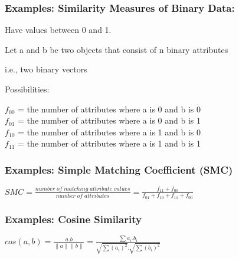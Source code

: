\begin{frame}[fragile]\frametitle{Examples: Similarity Measures of Binary Data:}

	Have values between 0 and 1.
	
	Let a and b be two objects that consist of n binary attributes 
	
	i.e., two binary vectors
	
	Possibilities:

		$f_{00}$ = the number of attributes where a is 0 and b is 0 \\
		$f_{01}$ = the number of attributes where a is 0 and b is 1 \\
		$f_{10}$ = the number of attributes where a is 1 and b is 0 \\
		$f_{11}$ = the number of attributes where a is 1 and b is 1 \\
\end{frame}

\begin{frame}[fragile]\frametitle{Examples: Simple Matching Coefficient (SMC)} 

$
		SMC = \frac{number\;of\;matching\;attribute\;values}{number\;of\;attributes} = 
		\frac{f_{11} + f_{00}}{f_{01} + f_{10} + f_{11} + f_{00}}
$
\end{frame}

%
%

\begin{frame}[fragile]\frametitle{Examples: Cosine Similarity} 

$
		cos(a,b) = \frac{a . b}{\|a\| \|b\|} = \frac{\sum a_{i}. b_{i}}{\sqrt{\sum(a_{i})^2} .  \sqrt{\sum(b_{i})^{2}}}
$
\end{frame}

%


